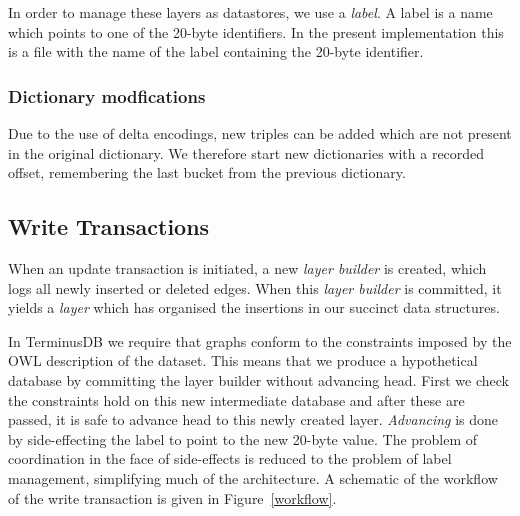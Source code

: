 \documentclass[10pt, a4paper, twocolumn]{article} %
\begin{document}
In order to manage these layers as datastores, we use a {\em label}. A
label is a name which points to one of the 20-byte identifiers. In the
present implementation this is a file with the name of the label
containing the 20-byte identifier.

\subsubsection{Dictionary modfications}

Due to the use of delta encodings, new triples can be added which are
not present in the original dictionary. We therefore start new
dictionaries with a recorded offset, remembering the last bucket from
the previous dictionary.

\subsection{Write Transactions}

When an update transaction is initiated, a new {\em layer builder} is
created, which logs all newly inserted or deleted edges. When this
{\em layer builder} is committed, it yields a {\em layer} which has
organised the insertions in our succinct data structures.

In TerminusDB we require that graphs conform to the constraints
imposed by the OWL description of the dataset. This means that we
produce a hypothetical database by committing the layer builder
without advancing head. First we check the constraints hold on this
new intermediate database and after these are passed, it is safe to
advance head to this newly created layer. {\em Advancing} is done by
side-effecting the label to point to the new 20-byte value. The
problem of coordination in the face of side-effects is reduced to the
problem of label management, simplifying much of the architecture. A
schematic of the workflow of the write transaction is given in
Figure~\ref{workflow}.
\end{document}
